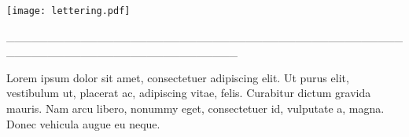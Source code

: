 \clearpage
\thispagestyle{empty}
\texttt{[image: lettering.pdf]}

\vspace{.5cm}

\raggedleft
{}

\hspace*{-1.5cm}\_\_\_\_\_\_\_\_\_\_\_\_\_\_\_\_\_\_\_\_\_\_\_\_\_\_\_\_\_\_\_\_\_\_\_\_\_\_\_\_\_\_\_\_\_\_\_\_\_\_\_\_\_\_\_\_\_\_\_\_\_\_\_\_\_\_\_\_\_\_\_\_\_\_\_\_

\vspace{1cm}

\parbox[b]{150pt}{\raggedright Lorem ipsum dolor sit amet, consectetuer
adipiscing elit. Ut purus elit, vestibulum ut,
placerat ac, adipiscing vitae, felis. Curabitur
dictum gravida mauris. Nam arcu libero,
nonummy eget, consectetuer id, vulputate a,
magna. Donec vehicula augue eu neque.} \enlargethispage{\baselineskip}